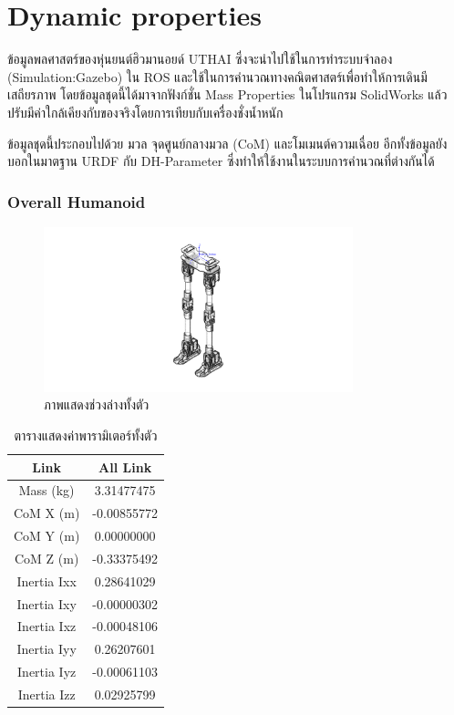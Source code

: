 \newcommand{\addprop}[9]{
	CoM X (m) & #1\\
	CoM Y (m) & #2\\
	CoM Z (m) & #3\\
	Inertia Ixx & #4\\
	Inertia Ixy & #5\\
	Inertia Ixz & #6\\
	Inertia Iyy & #7\\
	Inertia Iyz & #8\\
	Inertia Izz & #9\\
}

\section{Dynamic properties}
ข้อมูลพลศาสตร์ของหุ่นยนต์ฮิวมานอยด์ UTHAI ซึ่งจะนำไปใช้ในการทำระบบจำลอง (Simulation:Gazebo) ใน ROS
และใช้ในการคำนวณทางคณิตศาสตร์เพื่อทำให้การเดินมีเสถียรภาพ
โดยข้อมูลชุดนี้ได้มาจากฟังก์ชั่น Mass Properties ในโปรแกรม SolidWorks แล้วปรับมีค่าใกล้เคียงกับของจริงโดยการเทียบกับเครื่องชั่งน้ำหนัก

ข้อมูลชุดนี้ประกอบไปด้วย มวล จุดศูนย์กลางมวล (CoM) และโมเมนต์ความเฉื่อย อีกทั้งข้อมูลยังบอกในมาตฐาน URDF กับ DH-Parameter ซึ่งทำให้ใช้งานในระบบการคำนวณที่ต่างกันได้

\subsubsection*{Overall Humanoid}
\begin{figure}[!ht]
	\centering
	\includegraphics[width=0.8\textwidth]{appendix/images/uthai_dynamic_all.jpeg}
	\caption{ภาพแสดงช่วงล่างทั้งตัว}
	\label{fig:uthai_dynamic_all}
\end{figure}
\begin{table}[!ht]
	\centering
	\begin{tabular}{| c | c |}
		\hline
		Link & All Link\\
		\hline
		Mass (kg) & 3.31477475 \\
		\addprop{-0.00855772}{0.00000000}{-0.33375492}{0.28641029}{-0.00000302}{-0.00048106}{0.26207601}{-0.00061103}{0.02925799}
		\hline
	\end{tabular}
	\caption{ตารางแสดงค่าพารามิเตอร์ทั้งตัว}
	\label{tab:uthai_dynamic_all}
\end{table}


